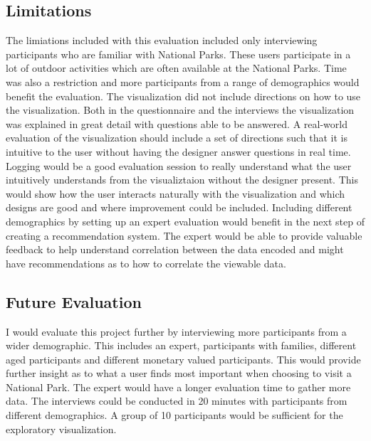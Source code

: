 \subsection{Limitations}
The limiations included with this evaluation included only interviewing participants who are familiar with National Parks. These users participate in a lot of outdoor activities which are often available at the National Parks. Time was also a restriction and more participants from a range of demographics would benefit the evaluation. The visualization did not include directions on how to use the visualization. Both in the questionnaire and the interviews the visualization was explained in great detail with questions able to be answered. A real-world evaluation of the visualization should include a set of directions such that it is intuitive to the user without having the designer answer questions in real time. Logging would be a good evaluation session to really understand what the user intuitively understands from the visualiztaion without the designer present. This would show how the user interacts naturally with the visualization and which designs are good and where improvement could be included. Including different demographics by setting up an expert evaluation would benefit in the next step of creating a recommendation system. The expert would be able to provide valuable feedback to help understand correlation between the data encoded and might have recommendations as to how to correlate the viewable data. 

\subsection{Future Evaluation}
I would evaluate this project further by interviewing more participants from a wider demographic. This includes an expert, participants with families, different aged participants and different monetary valued participants. This would provide further insight as to what a user finds most important when choosing to visit a National Park. The expert would have a longer evaluation time to gather more data. The interviews could be conducted in 20 minutes with participants from different demographics. A group of 10 participants would be sufficient for the exploratory visualization.